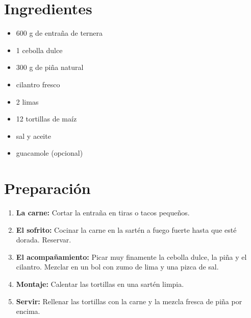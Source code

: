 
    \begin{minipage}[t]{0.35\textwidth}
        \section*{Ingredientes}
        \begin{itemize}[leftmargin=*]
            \item 600 g de entraña de ternera
            \item 1 cebolla dulce
            \item 300 g de piña natural
            \item cilantro fresco
            \item 2 limas
            \item 12 tortillas de maíz
            \item sal y aceite
            \item guacamole (opcional)
        \end{itemize}
    \end{minipage}
    \hfill
    \begin{minipage}[t]{0.6\textwidth}
        \section*{Preparación}
        \begin{enumerate}
            \item \textbf{La carne:} Cortar la entraña en tiras o tacos pequeños.
            \item \textbf{El sofrito:} Cocinar la carne en la sartén a fuego fuerte hasta que esté dorada. Reservar.
            \item \textbf{El acompañamiento:} Picar muy finamente la cebolla dulce, la piña y el cilantro. Mezclar en un bol con zumo de lima y una pizca de sal.
            \item \textbf{Montaje:} Calentar las tortillas en una sartén limpia.
            \item \textbf{Servir:} Rellenar las tortillas con la carne y la mezcla fresca de piña por encima.
        \end{enumerate}
    \end{minipage}

